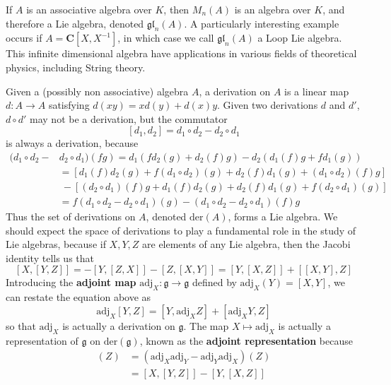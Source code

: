 \begin{example}
    If $A$ is an associative algebra over $K$, then $M_n(A)$ is an algebra over $K$, and therefore a Lie algebra, denoted $\mathfrak{gl}_n(A)$. A particularly interesting example occurs if $A = \mathbf{C}[X,X^{-1}]$, in which case we call $\mathfrak{gl}_n(A)$ a Loop Lie algebra. This infinite dimensional algebra have applications in various fields of theoretical physics, including String theory.
\end{example}

\begin{example}
    Given a (possibly non associative) algebra $A$, a derivation on $A$ is a linear map $d: A \to A$ satisfying $d(xy) = xd(y) + d(x)y$. Given two derivations $d$ and $d'$, $d \circ d'$ may not be a derivation, but the commutator
    \[ [d_1, d_2] = d_1 \circ d_2 - d_2 \circ d_1 \]
    is always a derivation, because
    \begin{align*}
        (d_1 \circ d_2 - &d_2 \circ d_1)(fg) = d_1(f d_2(g) + d_2(f) g) - d_2(d_1(f) g + f d_1(g))\\
        &= [d_1(f) d_2(g) + f (d_1 \circ d_2)(g) + d_2(f) d_1(g) + (d_1 \circ d_2)(f) g]\\
        &\ - [(d_2 \circ d_1)(f) g + d_1(f) d_2(g) + d_2(f) d_1(g) + f (d_2 \circ d_1)(g)]\\
        &= f(d_1 \circ d_2 - d_2 \circ d_1)(g) - (d_1 \circ d_2 - d_2 \circ d_1)(f) g
    \end{align*}
    Thus the set of derivations on $A$, denoted $\text{der}(A)$, forms a Lie algebra. We should expect the space of derivations to play a fundamental role in the study of Lie algebras, because if $X,Y,Z$ are elements of any Lie algebra, then the Jacobi identity tells us that
    \[ [X,[Y,Z]] = - [Y,[Z,X]] - [Z,[X,Y]] = [Y,[X,Z]] + [[X,Y],Z] \]
    Introducing the {\bf adjoint map} $\text{adj}_X: \mathfrak{g} \to \mathfrak{g}$ defined by $\text{adj}_X(Y) = [X,Y]$, we can restate the equation above as
    \[ \text{adj}_X[Y,Z] = [Y, \text{adj}_X Z] + [\text{adj}_XY, Z] \]
    so that $\text{adj}_X$ is actually a derivation on $\mathfrak{g}$. The map $X \mapsto \text{adj}_X$ is actually a representation of $\mathfrak{g}$ on $\text{der}(\mathfrak{g})$, known as the {\bf adjoint representation} because
    \begin{align*}
        [\text{adj}_X, \text{adj}_Y](Z) &= (\text{adj}_X \text{adj}_Y - \text{adj}_Y \text{adj}_X)(Z)\\
        &= [X,[Y,Z]] - [Y,[X,Z]]\\

\end{align*}
\end{example}
